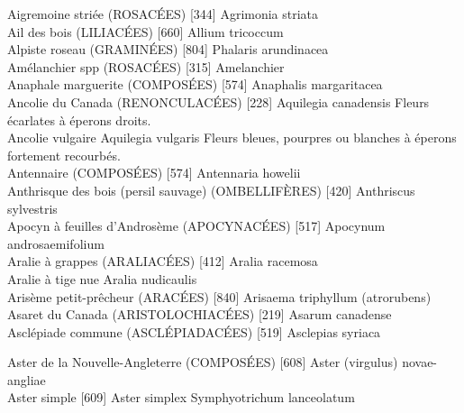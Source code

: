 \documentclass[book,12pt,a4paper,onecolumn,openany]{memoir}
\begin{document}
\newpage

Aigremoine striée (ROSACÉES)  [344]
				Agrimonia striata\\

Ail des bois (LILIACÉES)  [660]					
				Allium tricoccum\\

Alpiste roseau (GRAMINÉES)  [804]
				Phalaris arundinacea\\

Amélanchier spp (ROSACÉES)  [315]				
				Amelanchier\\

Anaphale marguerite (COMPOSÉES)  [574]
				Anaphalis margaritacea\\

Ancolie du Canada (RENONCULACÉES)  [228]
				Aquilegia canadensis
Fleurs écarlates à éperons droits.\\


Ancolie vulgaire
				Aquilegia vulgaris
Fleurs bleues, pourpres ou blanches à éperons fortement recourbés.\\


Antennaire (COMPOSÉES)  [574]
				Antennaria howelii\\
				


Anthrisque des bois (persil sauvage) (OMBELLIFÈRES)  [420]
				Anthriscus sylvestris\\
				

Apocyn à feuilles d’Androsème (APOCYNACÉES)  [517]
				Apocynum androsaemifolium\\


Aralie à grappes (ARALIACÉES)  [412]
				Aralia racemosa\\


Aralie à tige nue
				Aralia nudicaulis\\


Arisème petit-prêcheur (ARACÉES)  [840]					
				Arisaema triphyllum (atrorubens)\\


Asaret du Canada (ARISTOLOCHIACÉES)  [219]			
				Asarum canadense\\			


Asclépiade commune (ASCLÉPIADACÉES)  [519]
				Asclepias syriaca\\
\newpage

Aster de la Nouvelle-Angleterre (COMPOSÉES)  [608]
				Aster (virgulus)  novae-angliae\\

Aster simple  [609]
				Aster simplex
				Symphyotrichum lanceolatum\\
\end{document}
